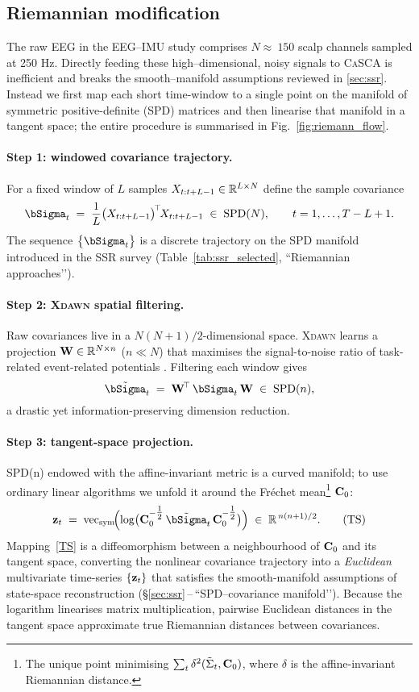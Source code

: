 \documentclass[14pt]{extarticle}
\begin{document}
	\subsection{Riemannian modification}
	\label{subsec:riemannian}
	
	The raw EEG in the EEG–IMU study comprises $N \approx\ 150$ scalp channels sampled at 250 Hz.
	Directly feeding these high–dimensional, noisy signals to
	\textsc{CaSCA} is inefficient and breaks the smooth–manifold
	assumptions reviewed in \ref{sec:ssr}.  
	Instead we first map each short time-window to a single point on the manifold of symmetric positive-definite (SPD) matrices and then
	linearise that manifold in a tangent space; the entire procedure is
	summarised in Fig.~\ref{fig:riemann_flow}.
	
	\paragraph{Step 1: windowed covariance trajectory.}
	For a fixed window of $L$ samples
	$X_{t:t+L-1}\in\mathbb{R}^{L\times N}$ define the sample covariance
	\[
	\bSigma_t
	\;=\;
	\frac1L \bigl(X_{t:t+L-1}\bigr)^{\!\top}\!X_{t:t+L-1}
	\;\in\;
	\mathrm{SPD}(N),\qquad
	t = 1,\dots,T-L+1 .
	\]
	The sequence $\bigl\{\bSigma_t\bigr\}$ is a discrete trajectory on the
	SPD manifold introduced in the SSR survey
	(Table~\ref{tab:ssr_selected}, “Riemannian approaches’’).
	
	\paragraph{Step 2: \textsc{Xdawn} spatial filtering.}
	Raw covariances live in a $N(N+1)/2$-dimensional space.
	\textsc{Xdawn} learns a projection %
	$\mathbf{W}\in\mathbb{R}^{N\times n}$ ($n\!\ll\!N$) that maximises the
	signal-to-noise ratio of task-related event-related potentials
	\citep{rivet2009xdawn}.  Filtering each window gives
	\[
	\tilde{\bSigma}_t
	\;=\;
	\bW^{\!\top}\,\bSigma_t\,\bW
	\;\in\;
	\mathrm{SPD}(n),
	\]
	a drastic yet information-preserving dimension reduction.
	
	\paragraph{Step 3: tangent-space projection.}
	SPD(n) endowed with the affine-invariant metric is a curved manifold;
	to use ordinary linear algorithms we unfold it around the Fréchet
	mean\footnote{The unique point minimising
		$\sum_t \delta^2(\tilde{\Sigma}_t,\mathbf{C}_0)$, where
		$\delta$ is the affine-invariant Riemannian distance.}
	$\mathbf{C}_0$:
	\[
	\bz_t
	\;=\;
	\operatorname{vec}_{\mathrm{sym}}\!
	\Bigl(
	\log\bigl(\bC_0^{-\tfrac12}\,
	\tilde{\bSigma}_t\,
	\bC_0^{-\tfrac12}\bigr)
	\Bigr)
	\;\in\;
	\R^{\,n(n+1)/2}.
	\tag{TS}
	\]
	Mapping~\eqref{TS} is a diffeomorphism between a neighbourhood of
	$\mathbf{C}_0$ and its tangent space, converting the nonlinear covariance
	trajectory into a \emph{Euclidean} multivariate time-series
	$\{\mathbf{z}_t\}$ that satisfies the smooth-manifold assumptions of
	state-space reconstruction (\S\ref{sec:ssr}\,–\,“SPD–covariance
	manifold’’).  Because the logarithm linearises matrix multiplication,
	pairwise Euclidean distances in the tangent space approximate true
	Riemannian distances between covariances.
	
\end{document}
